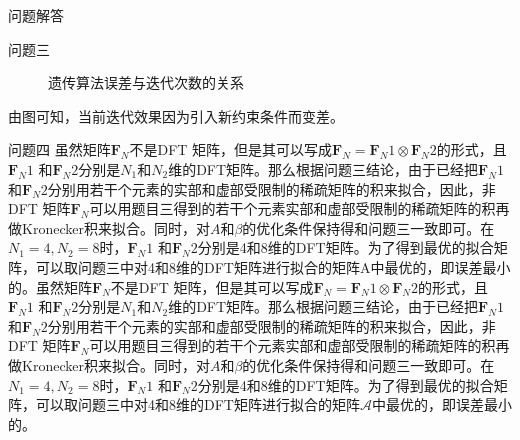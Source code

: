 \documentclass[11pt]{article}
\begin{document}
\begin{section}{问题解答}
\begin{subsection}{问题三}
\begin{figure}[H]
     \label{fig:问题三遗传算法误差与迭代次数的关系}
     \caption{遗传算法误差与迭代次数的关系}
   \end{figure}
   由图可知，当前迭代效果因为引入新约束条件而变差。
 \end{subsection}
 \begin{subsection}{问题四}
   虽然矩阵$\mathbf{F}_N$不是DFT 矩阵，但是其可以写成$\mathbf{F}_N=\mathbf{F}_N1⊗\mathbf{F}_N2$的形式，且$\mathbf{F}_N1$ 和$\mathbf{F}_N2$分别是$N_1$和$N_2$维的DFT矩阵。那么根据问题三结论，由于已经把$\mathbf{F}_N1$ 和$\mathbf{F}_N2$分别用若干个元素的实部和虚部受限制的稀疏矩阵的积来拟合，因此，非DFT 矩阵$\mathbf{F}_N$可以用题目三得到的若干个元素实部和虚部受限制的稀疏矩阵的积再做Kronecker积来拟合。同时，对$A$和$\beta$的优化条件保持得和问题三一致即可。在$N_1=4, N_2=8$时，$\mathbf{F}_N1$ 和$\mathbf{F}_N2$分别是4和8维的DFT矩阵。为了得到最优的拟合矩阵，可以取问题三中对4和8维的DFT矩阵进行拟合的矩阵A中最优的，即误差最小的。虽然矩阵$\mathbf{F}_N$不是DFT 矩阵，但是其可以写成$\mathbf{F}_N=\mathbf{F}_N1\otimes \mathbf{F}_N2$的形式，且$\mathbf{F}_N1$ 和$\mathbf{F}_N2$分别是$N_1$和$N_2$维的DFT矩阵。那么根据问题三结论，由于已经把$\mathbf{F}_N1$ 和$\mathbf{F}_N2$分别用若干个元素的实部和虚部受限制的稀疏矩阵的积来拟合，因此，非DFT 矩阵$\mathbf{F}_N$可以用题目三得到的若干个元素实部和虚部受限制的稀疏矩阵的积再做Kronecker积来拟合。同时，对$A$和$\beta$的优化条件保持得和问题三一致即可。在$N_1=4, N_2=8$时，$\mathbf{F}_N1$ 和$\mathbf{F}_N2$分别是4和8维的DFT矩阵。为了得到最优的拟合矩阵，可以取问题三中对4和8维的DFT矩阵进行拟合的矩阵$\mathcal{A}$中最优的，即误差最小的。\par

\end{subsection}
\end{section}
\end{document}

